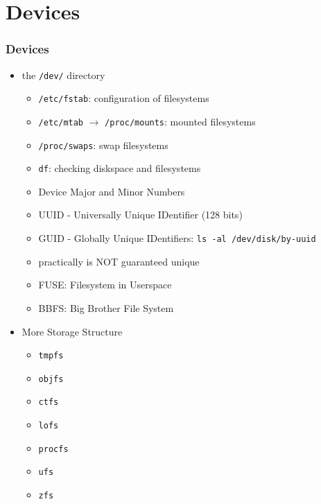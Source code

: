 \documentclass[xcolor=table, notheorems, hyperref={pdfpagelabels=false}]{beamer}
\begin{document}
\section{Devices}
\begin{frame}[fragile]
\frametitle{Devices}
\begin{itemize}
\item the \texttt{/dev/} directory
\begin{itemize}
\item \texttt{/etc/fstab}: configuration of filesystems
\item \texttt{/etc/mtab} $\rightarrow$ \texttt{/proc/mounts}: mounted filesystems
\item \texttt{/proc/swaps}: swap filesystems
\item \texttt{df}: checking diskspace and filesystems
\item Device Major and Minor Numbers
\item UUID - Universally Unique IDentifier (128 bits)
\item GUID - Globally Unique IDentifiers: \texttt{ls -al /dev/disk/by-uuid}
\item practically is NOT guaranteed unique
\item FUSE: Filesystem in Userspace
\item BBFS: Big Brother File System
\end{itemize}
\item More Storage Structure
\begin{itemize}
\item \texttt{tmpfs}
\item \texttt{objfs}
\item \texttt{ctfs}
\item \texttt{lofs}
\item \texttt{procfs}
\item \texttt{ufs}
\item \texttt{zfs}
\end{itemize}
\end{itemize}
\end{frame}
\end{document}
